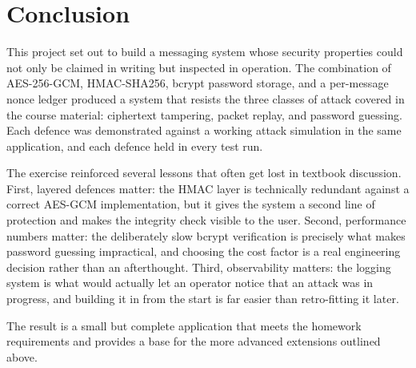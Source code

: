 \documentclass[conference]{IEEEtran}
\begin{document}
\section{Conclusion}
\label{sec:conclusion}

This project set out to build a messaging system whose security properties could not only be claimed in writing but inspected in operation. The combination of AES-256-GCM, HMAC-SHA256, bcrypt password storage, and a per-message nonce ledger produced a system that resists the three classes of attack covered in the course material: ciphertext tampering, packet replay, and password guessing. Each defence was demonstrated against a working attack simulation in the same application, and each defence held in every test run.

The exercise reinforced several lessons that often get lost in textbook discussion. First, layered defences matter: the HMAC layer is technically redundant against a correct AES-GCM implementation, but it gives the system a second line of protection and makes the integrity check visible to the user. Second, performance numbers matter: the deliberately slow bcrypt verification is precisely what makes password guessing impractical, and choosing the cost factor is a real engineering decision rather than an afterthought. Third, observability matters: the logging system is what would actually let an operator notice that an attack was in progress, and building it in from the start is far easier than retro-fitting it later.

The result is a small but complete application that meets the homework requirements and provides a base for the more advanced extensions outlined above.
\end{document}
